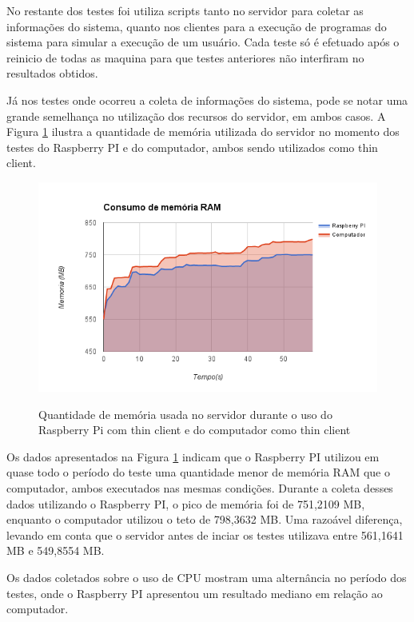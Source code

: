 \documentclass[
	12pt,				%
	openright,			%
	twoside,			%
	a4paper,			%
	chapter=TITLE,		%
	english,			%
	brazil				%
	]{abntex2}
\begin{document}
No restante dos testes foi utiliza scripts tanto no servidor para coletar as informações do sistema, quanto nos clientes para a execução de programas do sistema para simular a execução de um usuário. Cada teste só é efetuado após o reinicio de todas as maquina para que testes anteriores não interfiram no resultados obtidos.

Já nos testes onde ocorreu a coleta de informações do sistema, pode se notar uma grande semelhança no utilização dos recursos do servidor, em ambos casos. A Figura \ref{fig:memoria} ilustra a quantidade de memória utilizada do servidor no momento dos testes do Raspberry PI e do computador, ambos sendo utilizados como thin client.

\begin{figure}[!htb]
\centering
\caption{Quantidade de memória usada no servidor durante o uso do Raspberry Pi com thin client e do computador como thin client}
\includegraphics[scale=0.8]{Imagens/memoria}
\label{fig:memoria}
\end{figure}


Os dados apresentados na Figura \ref{fig:memoria} indicam que o Raspberry PI utilizou em quase todo o período do teste uma quantidade menor de memória RAM que o computador, ambos executados nas mesmas condições. Durante a coleta desses dados utilizando o Raspberry PI, o pico de memória foi de 751,2109 MB, enquanto o computador utilizou o teto de 798,3632 MB. Uma razoável diferença, levando em conta que o servidor antes de inciar os testes utilizava entre 561,1641 MB e 549,8554 MB. 

Os dados coletados sobre o  uso de CPU mostram uma alternância no período dos testes, onde o Raspberry PI apresentou um resultado mediano em relação ao computador.
\end{document}
